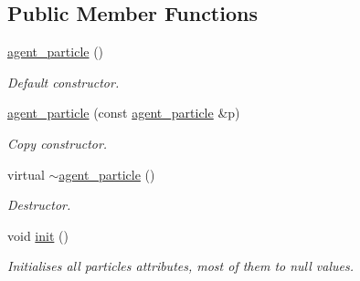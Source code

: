 \subsection*{Public Member Functions}
\begin{DoxyCompactItemize}
\item 
\mbox{\label{classphysim_1_1particles_1_1agent__particle_aac223ecaf20c17b0ac3198ee1248938c}} 
\hyperlink{classphysim_1_1particles_1_1agent__particle_aac223ecaf20c17b0ac3198ee1248938c}{agent\+\_\+particle} ()
\begin{DoxyCompactList}\small\item\em Default constructor. \end{DoxyCompactList}\item 
\mbox{\label{classphysim_1_1particles_1_1agent__particle_a319cdfd5aeb3dbe7df1d8dade4999db8}} 
\hyperlink{classphysim_1_1particles_1_1agent__particle_a319cdfd5aeb3dbe7df1d8dade4999db8}{agent\+\_\+particle} (const \hyperlink{classphysim_1_1particles_1_1agent__particle}{agent\+\_\+particle} \&p)
\begin{DoxyCompactList}\small\item\em Copy constructor. \end{DoxyCompactList}\item 
\mbox{\label{classphysim_1_1particles_1_1agent__particle_a8198fc4f3f25ece0d43c1ec1ce36ac1c}} 
virtual \hyperlink{classphysim_1_1particles_1_1agent__particle_a8198fc4f3f25ece0d43c1ec1ce36ac1c}{$\sim$agent\+\_\+particle} ()
\begin{DoxyCompactList}\small\item\em Destructor. \end{DoxyCompactList}\item 
void \hyperlink{classphysim_1_1particles_1_1agent__particle_ac13082909f480fc55d406321c77d38b1}{init} ()
\begin{DoxyCompactList}\small\item\em Initialises all particle\textquotesingle{}s attributes, most of them to null values. \end{DoxyCompactList}\item 
\mbox{\label{classphysim_1_1particles_1_1agent__particle_aa053f50646658dcb4676a1ffd688a8ce}} 

\end{DoxyCompactItemize}
